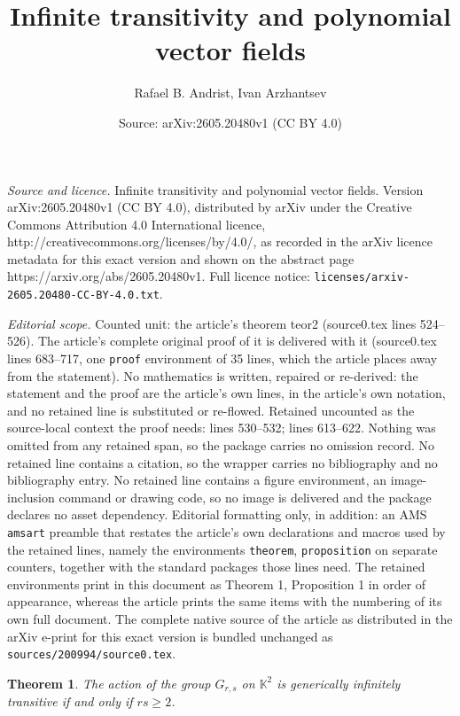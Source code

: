 \documentclass[10pt,a4paper]{amsart}
\title{Infinite transitivity and polynomial vector fields}
\author{Rafael B. Andrist, Ivan Arzhantsev}
\date{Source: arXiv:2605.20480v1 (CC BY 4.0)}
\newtheorem{theorem}{Theorem}
\def\KK{{\mathbb K}}
\renewcommand{\ge}{\geqslant}
\begin{document}
\maketitle

\noindent\emph{Source and licence.} Infinite transitivity and polynomial vector fields. Version arXiv:2605.20480v1 (CC BY 4.0), distributed by arXiv under the Creative Commons Attribution 4.0 International licence, http://creativecommons.org/licenses/by/4.0/, as recorded in the arXiv licence metadata for this exact version and shown on the abstract page https://arxiv.org/abs/2605.20480v1. Full licence notice: \texttt{licenses/arxiv-2605.20480-CC-BY-4.0.txt}.\par\smallskip

\noindent\textit{Editorial scope.} Counted unit: the article's theorem teor2 (source0.tex lines 524--526). The article's complete original proof of it is delivered with it (source0.tex lines 683--717, one \texttt{proof} environment of 35 lines, which the article places away from the statement). No mathematics is written, repaired or re-derived: the statement and the proof are the article's own lines, in the article's own notation, and no retained line is substituted or re-flowed.  Retained uncounted as the source-local context the proof needs: lines 530--532; lines 613--622.  Nothing was omitted from any retained span, so the package carries no omission record.  No retained line contains a citation, so the wrapper carries no bibliography and no bibliography entry.  No retained line contains a figure environment, an image-inclusion command or drawing code, so no image is delivered and the package declares no asset dependency.  Editorial formatting only, in addition: an AMS \texttt{amsart} preamble that restates the article's own declarations and macros used by the retained lines, namely the environments \texttt{theorem}, \texttt{proposition} on separate counters, together with the standard packages those lines need.  The retained environments print in this document as Theorem 1, Proposition 1 in order of appearance, whereas the article prints the same items with the numbering of its own full document.  The complete native source of the article as distributed in the arXiv e-print for this exact version is bundled unchanged as \texttt{sources/200994/source0.tex}.
\begin{theorem} \label{geninftra}
The action of the group $G_{r,s}$ on $\KK^2$ is generically infinitely transitive if and only if $rs\ge 2$.
\end{theorem}
\end{document}
